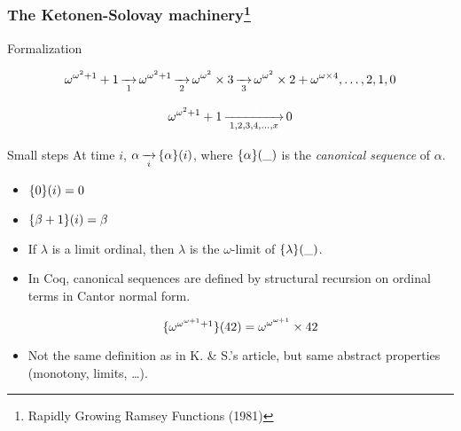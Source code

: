 \documentclass[10pt, fleqn]{beamer}
\begin{document}

\begin{frame}
  \frametitle{The Ketonen-Solovay machinery\footnote{Rapidly Growing {R}amsey Functions (1981)}}
    \begin{block}{Formalization}

      $$\omega^{\omega^2+1}+1 \rplus{1} \omega^{\omega^2+1}
      \rplus{2} \omega^{\omega^2}\times 3 
      \rplus{3} \omega^{\omega^2}\times 2 +
      \omega ^ {\omega \times 4}, \dots,2,1,0$$

      \vspace{6pt}
      
      $$ \omega^{\omega^2+1}+1 \rplus{1,2,3,4,\dots,x} 0$$
    \end{block}
    
      \begin{block}{Small steps}
        At time $i$, 
           $\alpha \rplus{i} \canonseq{\alpha}{i}$,
        where $\mbox{$\{\alpha\}(\_)$}$ is the \emph{canonical sequence} of $\alpha$.
        \begin{itemize}
        \item $\mbox{$\{0\}(i)$}=0$
        \item $\mbox{$\{\beta+1\}(i)$}=\beta$
        \item If $\lambda$ is a limit ordinal, then $\lambda$ is the $\omega$-limit of $\mbox{$\{\lambda\}(\_)$}$.
        \end{itemize}
    \end{block}
  
    
    
 
   
 
  \end{frame}

\begin{frame}
   
     \begin{block}{}
       \begin{itemize}
       \item In Coq, canonical sequences are defined by structural recursion on ordinal terms in Cantor normal form.
         
   {\color{mathcolor}
         $$\mbox{$\{\omega^{\omega^{\omega+1}+1}\}(42)$}=
         \omega^{\omega^{\omega+1}}\times 42$$
         }
         
         
       \item Not the same definition as in K. \& S.'s article, but same abstract properties (monotony, limits, \dots).
       \end{itemize}
     \end{block}
\end{frame}
\end{document}
